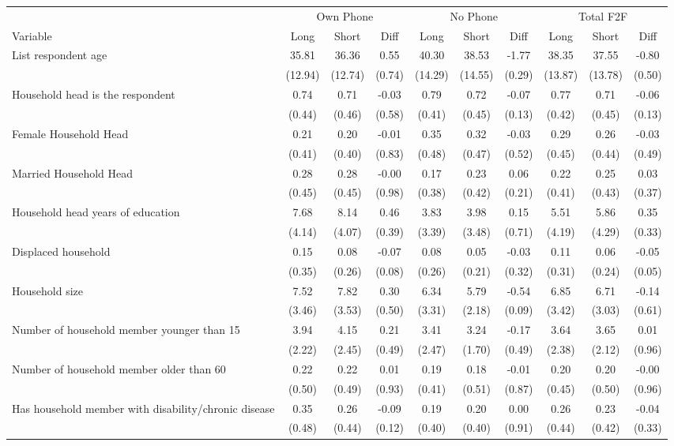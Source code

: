 \begin{tabular}{l*{9}c}
\hline\hline
 & \multicolumn{3}{c}{Own Phone} & \multicolumn{3}{c}{No Phone} & \multicolumn{3}{c}{Total F2F}\\ 
Variable & Long & Short & Diff & Long & Short & Diff & Long & Short & Diff \\
\hline
List respondent age&35.81&36.36&0.55&40.30&38.53&-1.77&38.35&37.55&-0.80\\
&(12.94)&(12.74)&(0.74)&(14.29)&(14.55)&(0.29)&(13.87)&(13.78)&(0.50)\\
Household head is the respondent&0.74&0.71&-0.03&0.79&0.72&-0.07&0.77&0.71&-0.06\\
&(0.44)&(0.46)&(0.58)&(0.41)&(0.45)&(0.13)&(0.42)&(0.45)&(0.13)\\
Female Household Head&0.21&0.20&-0.01&0.35&0.32&-0.03&0.29&0.26&-0.03\\
&(0.41)&(0.40)&(0.83)&(0.48)&(0.47)&(0.52)&(0.45)&(0.44)&(0.49)\\
Married Household Head&0.28&0.28&-0.00&0.17&0.23&0.06&0.22&0.25&0.03\\
&(0.45)&(0.45)&(0.98)&(0.38)&(0.42)&(0.21)&(0.41)&(0.43)&(0.37)\\
Household head years of education&7.68&8.14&0.46&3.83&3.98&0.15&5.51&5.86&0.35\\
&(4.14)&(4.07)&(0.39)&(3.39)&(3.48)&(0.71)&(4.19)&(4.29)&(0.33)\\
Displaced household&0.15&0.08&-0.07&0.08&0.05&-0.03&0.11&0.06&-0.05\\
&(0.35)&(0.26)&(0.08)&(0.26)&(0.21)&(0.32)&(0.31)&(0.24)&(0.05)\\
Household size&7.52&7.82&0.30&6.34&5.79&-0.54&6.85&6.71&-0.14\\
&(3.46)&(3.53)&(0.50)&(3.31)&(2.18)&(0.09)&(3.42)&(3.03)&(0.61)\\
Number of household member younger than 15&3.94&4.15&0.21&3.41&3.24&-0.17&3.64&3.65&0.01\\
&(2.22)&(2.45)&(0.49)&(2.47)&(1.70)&(0.49)&(2.38)&(2.12)&(0.96)\\
Number of household member older than 60&0.22&0.22&0.01&0.19&0.18&-0.01&0.20&0.20&-0.00\\
&(0.50)&(0.49)&(0.93)&(0.41)&(0.51)&(0.87)&(0.45)&(0.50)&(0.96)\\
Has household member with disability/chronic disease&0.35&0.26&-0.09&0.19&0.20&0.00&0.26&0.23&-0.04\\
&(0.48)&(0.44)&(0.12)&(0.40)&(0.40)&(0.91)&(0.44)&(0.42)&(0.33)\\

\end{tabular}
